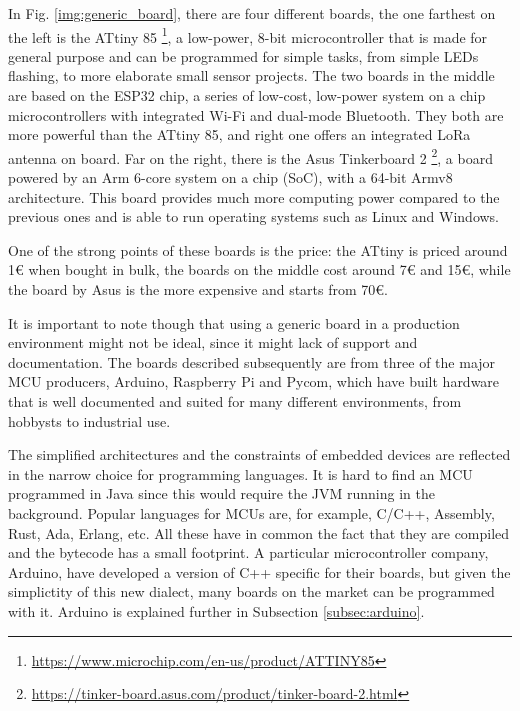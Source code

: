 	In Fig. \ref{img:generic_board}, there are four different boards, the one farthest on the left is the ATtiny 85 \footnote{\url{https://www.microchip.com/en-us/product/ATTINY85}}, a low-power, 8-bit microcontroller that is made for general purpose and can be programmed for simple tasks, from simple LEDs flashing, to more elaborate small sensor projects.
	The two boards in the middle are based on the ESP32 chip, a series of low-cost, low-power system on a chip microcontrollers with integrated Wi-Fi and dual-mode Bluetooth.
	They both are more powerful than the ATtiny 85, and right one offers an integrated LoRa antenna on board.
	Far on the right, there is the Asus Tinkerboard 2 \footnote{\url{https://tinker-board.asus.com/product/tinker-board-2.html}}, a board powered by an Arm 6-core system on a chip (SoC), with a 64-bit Armv8 architecture.
	This board provides much more computing power compared to the previous ones and is able to run operating systems such as Linux and Windows.
	
	One of the strong points of these boards is the price: the ATtiny is priced around 1€ when bought in bulk, the boards on the middle cost around 7€ and 15€, while the board by Asus is the more expensive and starts from 70€.
	
	It is important to note though that using a generic board in a production environment might not be ideal, since it might lack of support and documentation.
	The boards described subsequently are from three of the major MCU producers, Arduino, Raspberry Pi and Pycom, which have built hardware that is well documented and suited for many different environments, from hobbysts to industrial use.
	
	The simplified architectures and the constraints of embedded devices are reflected in the narrow choice for programming languages.
	It is hard to find an MCU programmed in Java since this would require the JVM running in the background.
	Popular languages for MCUs are, for example, C/C++, Assembly, Rust, Ada, Erlang, etc.
	All these have in common the fact that they are compiled and the bytecode has a small footprint.
	A particular microcontroller company, Arduino, have developed a version of C++ specific for their boards, but given the simplictity of this new dialect, many boards on the market can be programmed with it.
	Arduino is explained further in Subsection \ref{subsec:arduino}.

